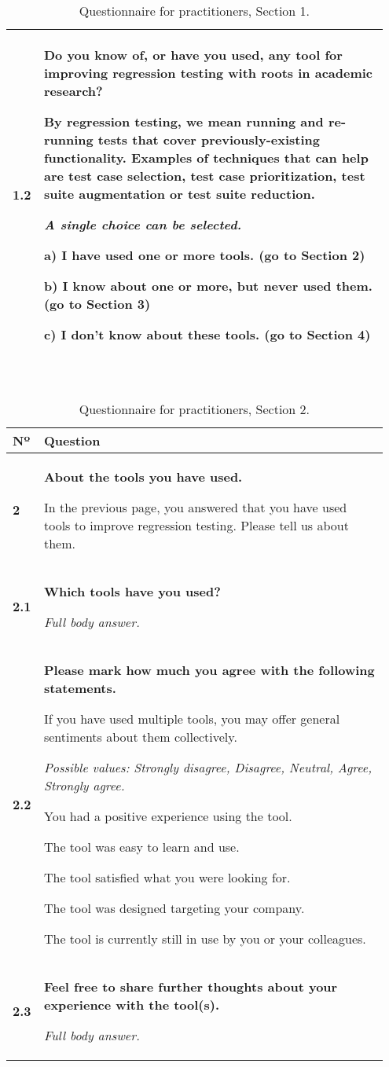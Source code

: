 \begin{table}[]
\begin{tabular}{p{0.05\linewidth}p{0.9\linewidth}}
\textbf{1.2} & \textbf{Do you know of, or have you used, any tool for improving regression testing with roots in academic research?}

By regression testing, we mean running and re-running tests that cover previously-existing functionality. Examples of techniques that can help are test case selection, test case prioritization, test suite augmentation or test suite reduction.

\textit{A single choice can be selected.}

a) I have used one or more tools. (go to Section 2)

b) I know about one or more, but never used them. (go to Section 3)

c) I don't know about these tools. (go to Section 4) \\
\bottomrule
\end{tabular}\\
\caption{Questionnaire for practitioners, Section 1.}
\label{table:interview_questions}
\end{table}


\begin{table}[]
\centering
\small
{}
\begin{tabular}{p{0.05\linewidth}p{0.9\linewidth}}
\toprule
\textbf{Nº} & \textbf{Question} \\
\midrule
\textbf{2} & \textbf{About the tools you have used.} 

In the previous page, you answered that you have used tools to improve regression testing. Please tell us about them.	\\

\textbf{2.1} & \textbf{Which tools have you used?}

\textit{Full body answer.}\\

\textbf{2.2} & \textbf{Please mark how much you agree with the following statements.}

If you have used multiple tools, you may offer general sentiments about them collectively.

\textit{Possible values: Strongly disagree, Disagree, Neutral, Agree, Strongly agree.}

You had a positive experience using the tool.

The tool was easy to learn and use.

The tool satisfied what you were looking for.

The tool was designed targeting your company.

The tool is currently still in use by you or your colleagues. \\

\textbf{2.3} & \textbf{Feel free to share further thoughts about your experience with the tool(s).}

\textit{Full body answer.}\\
\bottomrule
\end{tabular}\\
\caption{Questionnaire for practitioners, Section 2.}
\label{table:interview_questions}
\end{table}



